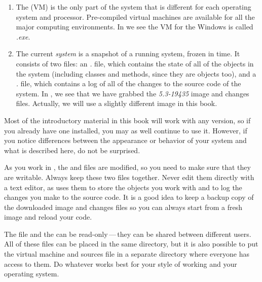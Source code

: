 \documentclass[a4paper,10pt,twoside]{book}
\begin{document}
\begin{enumerate}

  \item The  (VM) is the only part of the system that is different for each operating system and processor.  Pre-compiled virtual machines are available for all the major computing environments.
  In  we see the VM for the Windows is called \textit{\sq.exe}.

  \item The current \emph{system } is a snapshot of a running \sq system, frozen in time.
  It consists of two files: an \emph{.} file, which contains the state of all of the objects in the system (including classes and methods, since they are objects too), and a \emph{.} file, which contains a log of all of the changes to the source code of the system.
In , we see that we have grabbed the \textit{{\sq}5.3-19435} image and changes files.
Actually, we will use a slightly different image in this book.
\end{enumerate}

\label{sec:sbeImage}

Most of the introductory material in this book will work with any version, so if you already have one installed, you may as well continue to use it.
However, if you notice differences between the appearance or behavior of your system and what is described here, do not be surprised.

As you work in \sq, the  and  files are modified, so you need to make sure that they are writable.
Always keep these two files together.
Never edit them directly with a text editor, as \sq uses them to store the objects you work with and to log the changes you make to the source code.
It is a good idea to keep a backup copy of the downloaded image and changes files so you can always start from a fresh image and reload your code.

The  file and the  can be read-only\,---\,they can be shared between different users.
All of these files can be placed in the same directory, but it is also possible to put the virtual machine and sources file in a separate directory where everyone has access to them.
Do whatever works best for your style of working and your operating system.
\end{document}
